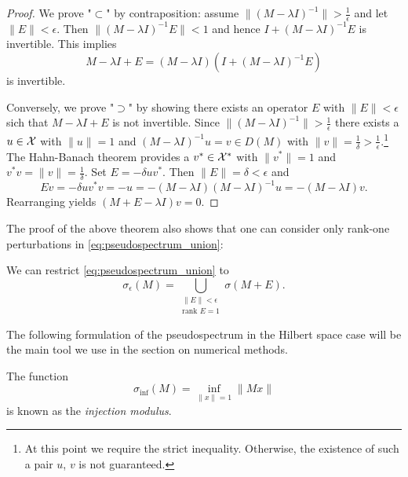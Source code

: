 \begin{proof}
    We prove "$\subset$" by contraposition: assume 
    $\| (M - \lambda I)^{-1} \| > \frac{1}{\epsilon}$ and let $\| E \| < \epsilon$. Then 
    $\| (M - \lambda I)^{-1} E \| < 1$ and hence $I + (M - \lambda I)^{-1} E$ is 
    invertible. This implies 
    \begin{equation}
        M - \lambda I + E 
        = \left( M - \lambda I \right) \left( I + (M - \lambda I)^{-1} E \right)
    \end{equation}
    is invertible. 

    Conversely, we prove "$\supset$" by showing there exists an operator $E$ with 
    $\| E \| < \epsilon$ sich that $M - \lambda I + E$ is not invertible. Since 
    $\| (M - \lambda I)^{-1} \| > \frac{1}{\epsilon}$ there exists a $u \in \mathcal{X}$ with 
    $\| u \| = 1$ and $(M - \lambda I)^{-1} u = v \in D(M)$ with 
    $\| v \| = \frac{1}{\delta} > \frac{1}{\epsilon}$.\footnote{
        At this point we require the strict inequality. Otherwise, the existence of such 
        a pair $u$, $v$ is not guaranteed. 
    } The Hahn-Banach theorem provides 
    a $v^* \in \mathcal{X}^*$ with $\| v^* \| = 1$ and $v^* v = \| v \| = \frac{1}{\delta}$. 
    Set $E = - \delta u v^*$. Then $\| E \| = \delta < \epsilon$ and 
    \begin{equation}
        E v = - \delta u v^* v = - u = - (M - \lambda I) (M - \lambda I)^{-1} u 
        = - (M - \lambda I) v . 
    \end{equation}
    Rearranging yields $(M + E - \lambda I) v = 0$. 
\end{proof}

The proof of the above theorem also shows that one can consider only rank-one 
perturbations in \ref{eq:pseudospectrum_union}: 

\begin{corollary}
    We can restrict \ref{eq:pseudospectrum_union} to 
    \begin{equation}
        \sigma_\epsilon (M) 
        = \bigcup_{\substack{ \| E \| < \epsilon \\ \text{rank }E = 1 }} 
        \sigma (M + E) . 
    \end{equation}
\end{corollary}

The following formulation of the pseudospectrum in the Hilbert space case will be the 
main tool we use in the section on numerical methods. 

\begin{definition}
    The function 
    \begin{equation}
        \sigma_{\inf} (M) = \inf_{\| x \| = 1} \| M x \|
    \end{equation}
    is known as the \emph{injection modulus}. 
\end{definition}

